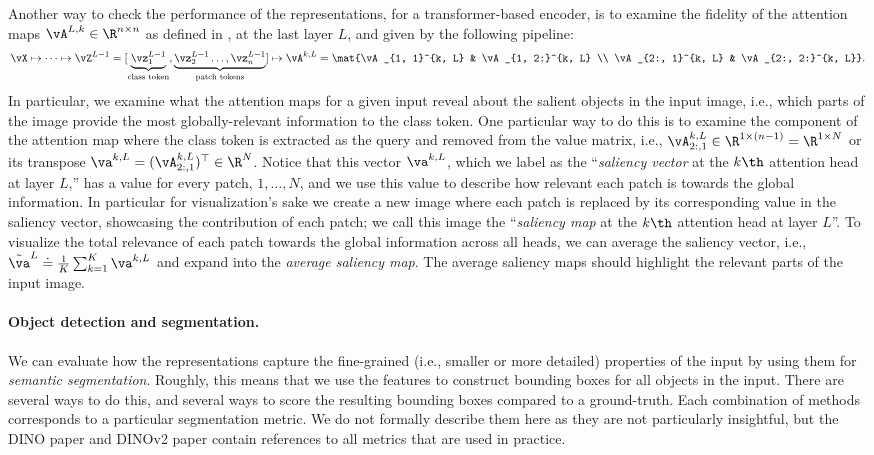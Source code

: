 \documentclass[../../book-main.tex]{subfiles}
\begin{document}
Another way to check the performance of the representations, for a transformer-based encoder, is to examine the fidelity of the attention maps \(\vA^{L, k} \in \R^{n \times n}\) as defined in , at the last layer \(L\), and given by the following pipeline:
\begin{align}
    \vX \mapsto \cdots \mapsto \vZ^{L - 1} = [\underbrace{\vz_{1}^{L - 1}}_{\text{class token}}, \underbrace{\vz_{2}^{L - 1} \dots, \vz_{n}^{L - 1}}_{\text{patch tokens}}] \mapsto \vA^{k, L} = \mat{\vA_{1, 1}^{k, L} & \vA_{1, 2:}^{k, L} \\ \vA_{2:, 1}^{k, L} & \vA_{2:, 2:}^{k, L}}.
\end{align}
In particular, we examine what the attention maps for a given input reveal about the salient objects in the input image, i.e., which parts of the image provide the most globally-relevant information to the class token. One particular way to do this is to examine the component of the attention map where the class token is extracted as the query and removed from the value matrix, i.e., \(\vA_{2:, 1}^{k, L} \in \R^{1 \times (n - 1)} = \R^{1 \times N}\) or its transpose \(\va^{k, L} = (\vA_{2:, 1}^{k, L})^{\top} \in \R^{N}\). Notice that this vector \(\va^{k, L}\), which we label as the ``\textit{saliency vector} at the \(k\th\) attention head at layer \(L\),'' has a value for every patch, \(1, \dots, N\), and we use this value to describe how relevant each patch is towards the global information. In particular for visualization's sake we create a new image where each patch is replaced by its corresponding value in the saliency vector, showcasing the contribution of each patch; we call this image the ``\textit{saliency map} at the \(k\th\) attention head at layer \(L\)''. To visualize the total relevance of each patch towards the global information across all heads, we can average the saliency vector, i.e., \(\tilde{\va}^{L} \doteq \frac{1}{K}\sum_{k = 1}^{K}\va^{k, L}\) and expand into the \textit{average saliency map}. The average saliency maps should highlight the relevant parts of the input image.


\paragraph{Object detection and segmentation.}

We can evaluate how the representations capture the fine-grained (i.e., smaller or more detailed) properties of the input by using them for \textit{semantic segmentation}. Roughly, this means that we use the features to construct bounding boxes for all objects in the input. There are several ways to do this, and several ways to score the resulting bounding boxes compared to a ground-truth. Each combination of methods corresponds to a particular segmentation metric. We do not formally describe them here as they are not particularly insightful, but the DINO paper \citep{caron2021emerging} and DINOv2 paper \citep{oquab2023dinov2} contain references to all metrics that are used in practice.
\end{document}
